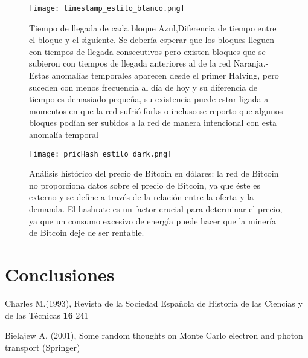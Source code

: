 \documentclass{rbf}
\begin{document}
\begin{figure*} 
  \texttt{[image: timestamp\_estilo\_blanco.png]}
    
 \caption{Tiempo de llegada de cada bloque Azul,Diferencia de tiempo entre el bloque y el siguiente.-Se debería esperar que los bloques lleguen con tiempos de llegada consecutivos pero existen bloques que se subieron con tiempos de llegada anteriores al de la red Naranja.-Estas anomalías temporales aparecen desde el primer Halving, pero suceden con menos frecuencia al día de hoy y su diferencia de tiempo es demasiado pequeña, su existencia puede estar ligada a momentos en que la red sufrió forks o incluso se reporto que algunos bloques podían ser subidos a la red de manera intencional con esta anomalía temporal }
\end{figure*}

\begin{figure*} 
  \texttt{[image: pricHash\_estilo\_dark.png]}
    
 \caption{Análisis histórico del precio de Bitcoin en dólares: la red de Bitcoin no proporciona datos sobre el precio de Bitcoin, ya que éste es externo y se define a través de la relación entre la oferta y la demanda. El hashrate es un factor crucial para determinar el precio, ya que un consumo excesivo de energía puede hacer que la minería de Bitcoin deje de ser rentable.  }
\end{figure*}
\section{Conclusiones}

\begin{thebibliography}

Charles M.(1993), Revista de la Sociedad Española de Historia de las Ciencias y de las T{\'e}cnicas {\bf 16} 241

Bielajew A. (2001), Some random thoughts on Monte Carlo electron and photon transport (Springer)



\end{thebibliography}
\end{document}
